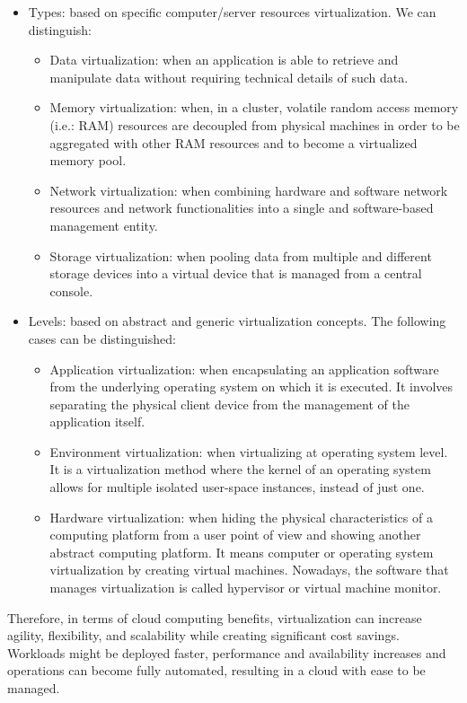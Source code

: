 \begin{itemize}
\item Types: based on specific computer/server resources virtualization. We can distinguish: 
\begin{itemize}
\item Data virtualization: when an application is able to retrieve and manipulate data without requiring technical details of such data.
\item Memory virtualization: when, in a cluster, volatile random access memory (i.e.: RAM) resources are decoupled from physical machines in order to be aggregated with other RAM resources and to become a virtualized memory pool.
\item Network virtualization: when combining hardware and software network resources and network functionalities into a single and software-based management entity.
\item Storage virtualization: when pooling data from multiple and different storage devices into a virtual device that is managed from a central console.
\end{itemize}
\item Levels: based on abstract and generic virtualization concepts. The following cases can be distinguished:
\begin{itemize}
\item Application virtualization: when encapsulating an application software from the underlying operating system on which it is executed. It involves separating the physical client device from the management of the application itself.
\item Environment virtualization: when virtualizing at operating system level. It is a virtualization method where the kernel of an operating system allows for multiple isolated user-space instances, instead of just one. 
\item Hardware virtualization: when hiding the physical characteristics of a computing platform from a user point of view and showing another abstract computing platform. It means computer or operating system virtualization by creating virtual machines.  Nowadays, the software that manages virtualization is called hypervisor or virtual machine monitor.
\end{itemize}
\end{itemize}

Therefore, in terms of cloud computing benefits, virtualization can increase agility, flexibility, and scalability while creating significant cost savings. Workloads might be deployed faster, performance and availability increases and operations can become fully automated, resulting in a cloud with ease to be managed. 

